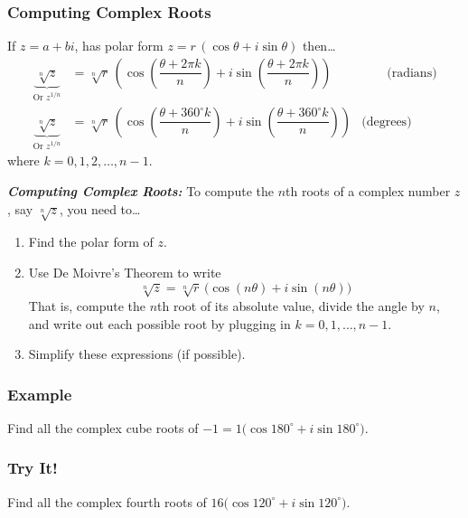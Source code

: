 \documentclass[12pt,xcolor={usenames,dvipsnames,x11names}]{beamer}
\begin{document}
\begin{frame}[t] \frametitle{Computing Complex Roots}

\begin{mythm} 
\scriptsize\color{egold} If $z= a + bi$, has polar form $z= r \,(\cos \theta + i \sin \theta)$ then\dots
	\[
	\begin{aligned}
	\underbrace{\sqrt[n]{z}}_{\text{Or } z^{1/n}}&= \sqrt[n]{r} \, \left( \cos \left( \dfrac{\theta + 2\pi k}{n} \right) + i \sin \left( \dfrac{\theta + 2\pi k}{n} \right) \right) & \qquad \text{(radians)} \\[0.5cm]
	\underbrace{\sqrt[n]{z}}_{\text{Or } z^{1/n}}&= \sqrt[n]{r} \, \left( \cos \left( \dfrac{\theta + 360^\circ k}{n} \right) + i \sin \left( \dfrac{\theta + 360^\circ k}{n} \right) \right) & \text{(degrees)}
	\end{aligned}
	\]
where $k= 0, 1, 2, \ldots, n-1$.
\end{mythm} \par\vspace{0.2cm}

{\scriptsize\itshape \color{egreen} \bfseries Computing Complex Roots:} \scriptsize To compute the $n$th roots of a complex number $z$, say $\sqrt[n]{z}$, you need to\dots
	\begin{enumerate}[1.]
	\item Find the polar form of $z$.
	\item Use De Moivre's Theorem to write 
		\[
		\sqrt[n]{z}= \sqrt[n]{r} \, \big( \cos(n\theta) + i \sin(n \theta) \big)
		\]
	That is, compute the $n$th root of its absolute value, divide the angle by $n$, and write out each possible root by plugging in $k= 0, 1, \ldots, n - 1$.
	\item Simplify these expressions (if possible).
	\end{enumerate}
\end{frame}



\begin{frame}[t] \frametitle{Example}
{\footnotesize Find all the complex cube roots of $-1= 1 \big( \cos 180^\circ + i \sin 180^\circ \big)$.}
\end{frame}



\begin{frame}[t] \frametitle{Try It!}
{\footnotesize Find all the complex fourth roots of $16 \big( \cos 120^\circ + i \sin 120^\circ \big)$.}
\end{frame}
\end{document}
